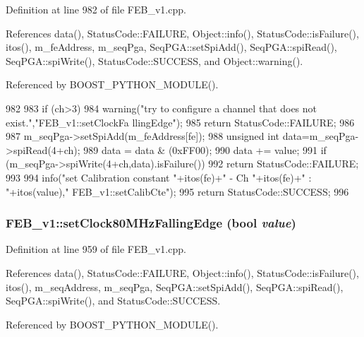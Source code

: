 Definition at line 982 of file FEB\_\-v1.cpp.

References data(), StatusCode::FAILURE, Object::info(), StatusCode::isFailure(), itos(), m\_\-feAddress, m\_\-seqPga, SeqPGA::setSpiAdd(), SeqPGA::spiRead(), SeqPGA::spiWrite(), StatusCode::SUCCESS, and Object::warning().

Referenced by BOOST\_\-PYTHON\_\-MODULE().


\begin{DoxyCode}
982                                                          {
983   if (ch>3){
984     warning("try to configure a channel that does not exist.","FEB_v1::setClockFa
      llingEdge");
985     return StatusCode::FAILURE;
986   }
987   m_seqPga->setSpiAdd(m_feAddress[fe]);
988   unsigned int data=m_seqPga->spiRead(4+ch);
989   data = data & (0xFF00);
990   data += value;
991   if (m_seqPga->spiWrite(4+ch,data).isFailure()){
992     return StatusCode::FAILURE;
993   }
994   info("set Calibration constant "+itos(fe)+" - Ch "+itos(fe)+" : "+itos(value),"
      FEB_v1::setCalibCte");
995   return StatusCode::SUCCESS;
996 }
\end{DoxyCode}
\hypertarget{classFEB__v1_a9ccd318b9a80b1cbd554ec6fe461cd82}{
\subsubsection[{setClock80MHzFallingEdge}]{ FEB\_\-v1::setClock80MHzFallingEdge (bool {\em value})}}
\label{classFEB__v1_a9ccd318b9a80b1cbd554ec6fe461cd82}


Definition at line 959 of file FEB\_\-v1.cpp.

References data(), StatusCode::FAILURE, Object::info(), StatusCode::isFailure(), itos(), m\_\-seqAddress, m\_\-seqPga, SeqPGA::setSpiAdd(), SeqPGA::spiRead(), SeqPGA::spiWrite(), and StatusCode::SUCCESS.

Referenced by BOOST\_\-PYTHON\_\-MODULE().


